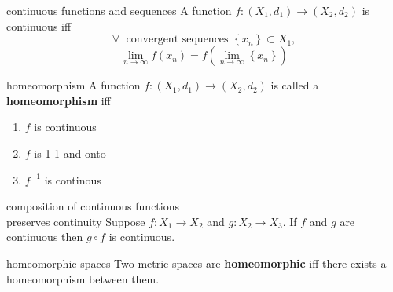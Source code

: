 \documentclass[avery5371,grid]{flashcards}
\begin{document}
\begin{flashcard}[Theorem]{continuous functions and sequences}
A function $f:(X_1,d_1) \rightarrow (X_2,d_2)$ is continuous iff
\begin{equation*}
\forall \; \mbox{ convergent sequences } \left\{ x_n \right\} \subset X_1,
\end{equation*}
\begin{equation*}
\lim_{n\rightarrow \infty} f(x_n) = f(\lim_{n\rightarrow \infty}
\left\{ x_n \right\})
\end{equation*}
\end{flashcard}

\begin{flashcard}[Definition]{homeomorphism}
A function $f:(X_1,d_1) \rightarrow (X_2,d_2)$ is called a
\mbox{\textbf{homeomorphism}} iff
\begin{enumerate}
 \item $f$ is continuous
 \item $f$ is 1-1 and onto
 \item $f^{-1}$ is continous
\end{enumerate}
\end{flashcard}



\begin{flashcard}[Theorem]{composition of continuous functions \\
preserves continuity}
Suppose $f:X_1 \rightarrow X_2$ and $g:X_2 \rightarrow X_3$.  If $f$
and $g$ are continuous then $g\circ f$ is continuous.
\end{flashcard}

\begin{flashcard}[Definition]{homeomorphic spaces}
Two metric spaces are \mbox{\textbf{homeomorphic}} iff there exists a
homeomorphism between them.
\end{flashcard}
\end{document}
